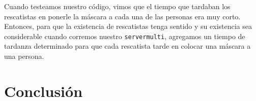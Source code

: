\documentclass[11pt, a4paper, twoside]{article}
\begin{document}
\par Cuando testeamos nuestro código, vimos que el tiempo que tardaban los rescatistas en ponerle la máscara
a cada una de las personas era muy corto. Entonces, para que la existencia de rescatistas tenga sentido y su
existencia sea considerable cuando corremos nuestro \texttt{servermulti}, agregamos un tiempo de tardanza
determinado para que cada rescatista tarde en colocar una máscara a una persona.

\newpage
{}
\section{Conclusión}
\end{document}
